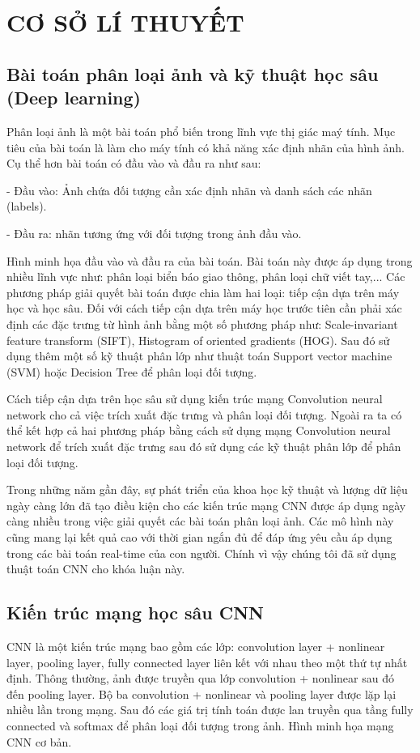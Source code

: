 
\chapter{CƠ SỞ LÍ THUYẾT}

\section{Bài toán phân loại ảnh và kỹ thuật học sâu (Deep learning)}
Phân loại ảnh là một bài toán phổ biến trong lĩnh vực thị giác maý tính. Mục tiêu của bài toán là làm cho máy tính có khả năng xác định nhãn của hình ảnh. Cụ thể hơn bài toán có đầu vào và đầu ra như sau:

- Đầu vào: Ảnh chứa đối tượng cần xác định nhãn và danh sách các nhãn (labels).

- Đầu ra: nhãn tương ứng với đối tượng trong ảnh đầu vào.

Hình minh họa đầu vào và đầu ra của bài toán. Bài toán này được áp dụng trong nhiều lĩnh vực như: phân loại biển báo giao thông, phân loại chữ viết tay,... Các phương pháp giải quyết bài toán được chia làm hai loại: tiếp cận dựa trên máy học và học sâu. Đối với cách tiếp cận dựa trên máy học trước tiên cần phải xác định các đặc trưng từ hình ảnh bằng một số phương pháp như: Scale-invariant feature transform (SIFT), Histogram of oriented gradients (HOG). Sau đó sử dụng thêm một số kỹ thuật phân lớp như thuật toán Support vector machine (SVM) hoặc Decision Tree để phân loại đối tượng. 

Cách tiếp cận dựa trên học sâu sử dụng kiến trúc mạng Convolution neural network cho cả việc trích xuất đặc trưng và phân loại đối tượng. Ngoài ra ta có thể kết hợp cả hai phương pháp bằng cách sử dụng mạng Convolution neural network để trích xuất đặc trưng sau đó sử dụng các kỹ thuật phân lớp để phân loại đối tượng. 

Trong những năm gần đây, sự phát triển của khoa học kỹ thuật và lượng dữ liệu ngày càng lớn đã tạo điều kiện cho các kiến trúc mạng CNN được áp dụng ngày càng nhiều trong việc giải quyết các bài toán phân loại ảnh. Các mô hình này cũng mang lại kết quả cao với thời gian ngắn đủ để đáp ứng yêu cầu áp dụng trong các bài toán real-time của con người. Chính vì vậy chúng tôi đã sử dụng thuật toán CNN cho khóa luận này.

\section{Kiến trúc mạng học sâu CNN}
CNN là một kiến trúc mạng bao gồm các lớp: convolution layer + nonlinear layer, pooling layer, fully connected layer liên kết với nhau theo một thứ tự nhất định. Thông thường, ảnh được truyền qua lớp convolution + nonlinear sau đó đến pooling layer. Bộ ba convolution + nonlinear và pooling layer được lặp lại nhiều lần trong mạng. Sau đó các giá trị tính toán được lan truyền qua tầng fully connected và softmax để phân loại đối tượng trong ảnh. Hình minh họa mạng CNN cơ bản.

